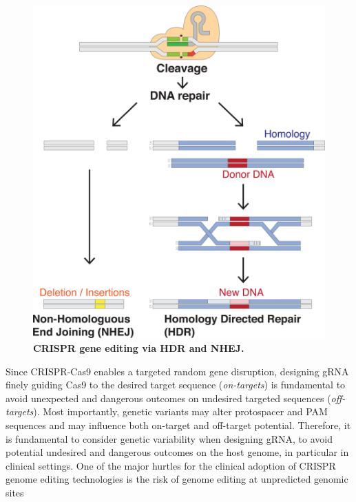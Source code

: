 \documentclass[a4paper, titlepage, openright]{book}
\begin{document}
\begin{figure}
	\centering
	\includegraphics[width=\textwidth]{figures/crispr.png}
	\caption[CRISPR gene editing via HDR and NHEJ]{\textbf{CRISPR gene editing via HDR and NHEJ.}}
	\label{fig:crispr}
\end{figure} 
Since CRISPR-Cas9 enables a targeted random gene disruption, designing gRNA finely guiding Cas9 to the desired target sequence (\emph{on-targets}) is fundamental to avoid unexpected and dangerous outcomes on undesired targeted sequences (\emph{off-targets}). 
Most importantly, genetic variants may alter protospacer and PAM sequences and may influence both on-target and off-target potential. Therefore, it is fundamental to consider genetic variability when designing gRNA, to avoid potential undesired and dangerous outcomes on the host genome, in particular in clinical settings.
One of the major hurtles for the clinical adoption of CRISPR genome editing technologies is the risk of genome editing at unpredicted genomic sites 


\end{document}
